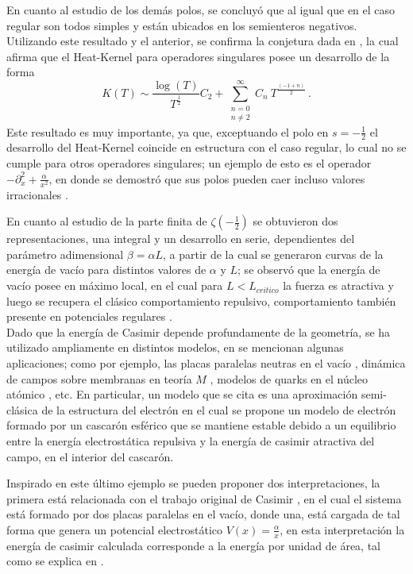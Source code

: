 En cuanto al estudio de los demás polos, se concluyó que al igual que en el caso regular son todos simples y están ubicados en los semienteros negativos. Utilizando este resultado y el anterior, se confirma la conjetura dada en \cite{callias1980}, la cual afirma que el Heat-Kernel para operadores singulares posee un desarrollo de la forma  
\begin{equation}
	K(T) \sim 
	\frac{ \log (T)}{T ^{\frac{1}{2} }} C _{2} +
	\sum _{\substack{n=0 \\ n \neq 2}} ^{\infty}
	C _n  \ 
	T^{\frac{(-1+n)}{2}} 
\, .
\end{equation}
Este resultado es muy importante, ya que, exceptuando el polo en $s = - \frac{1}{2}$ el desarrollo del Heat-Kernel coincide en estructura con el caso regular, lo cual no se cumple para otros operadores singulares; un ejemplo de esto es el operador $- \partial ^2 _x + \frac{\alpha}{x ^2}$, en donde se demostró que sus polos pueden caer incluso valores irracionales \cite{doi:10.1063/1.1809257}.


En cuanto al estudio de la parte finita de $\zeta \left( - \frac{1}{2} \right)$ se obtuvieron dos representaciones, una integral y un desarrollo en serie, dependientes del parámetro adimensional $\beta = \alpha L$, a partir de la cual se generaron curvas de la energía de vacío para distintos valores de $\alpha$ y $L$; se observó que la energía de vacío posee en máximo local, en el cual para  $L < L _{critico} $ la fuerza es atractiva y luego se recupera el clásico comportamiento repulsivo, comportamiento también presente en potenciales regulares \cite{Beauregard_2013}.\\

Dado que la energía de Casimir depende profundamente de la geometría, se ha utilizado ampliamente en distintos modelos, en \cite{Blau_1988} se mencionan algunas aplicaciones; como por ejemplo, las placas paralelas neutras en el vacío \cite{PLUNIEN198687}, dinámica de campos sobre membranas en teoría $M$ \cite{DEWIT1988545}, modelos de quarks en el núcleo atómico \cite{PhysRevD.14.2622}, etc. En particular, un modelo que se cita es una aproximación semi-clásica de la estructura del electrón \cite{MILTON198049} en el cual se propone un modelo de electrón formado por un cascarón esférico que se mantiene estable debido a un equilibrio entre la  energía electrostática repulsiva y la energía de casimir atractiva del campo, en el interior del cascarón.

Inspirado en este último ejemplo se pueden proponer dos interpretaciones, la primera está relacionada con el trabajo original de Casimir \cite{Casimir:1948dh}, en el cual el sistema está formado por dos placas paralelas en el vacío, donde una, está cargada de tal forma que genera un potencial electrostático $V (x) = \frac{\alpha}{x}$, en esta interpretación la energía de casimir calculada corresponde a la energía por unidad de área, tal como se explica en \cite{Blau_1988}.

